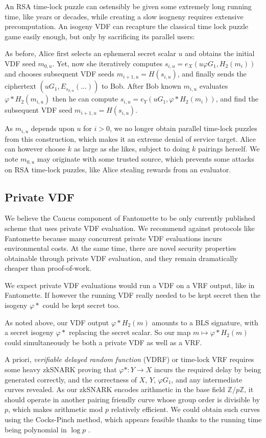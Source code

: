\documentclass{article}
\newcommand{\Z}{\mathbb{Z}}
\begin{document}
An RSA time-lock puzzle can ostensibly be given some extremely long
running time, like years or decades, while creating a slow isogneny
requires extensive precomputation.  An isogeny VDF can recapture the
classical time lock puzzle game easily enough, but only by sacrificing
its parallel users:

As before, Alice first selects an ephemeral secret scalar $u$ and
obtains the initial VDF seed $m_{0,u}$.  Yet, now she iteratively
computes $s_{i,u} = e_X ( u φ G_1, H_2(m_i) )$ and chooses subsequent
VDF seeds $m_{i+1,u} = H(s_{i,u})$, and finally sends the ciphertext
$(u G_1, E_{s_{k,u}}(\ldots))$ to Bob.
After Bob known $m_{i,u}$ evaluates $φ* H_2(m_{i,u})$ then he can
compute $s_{i,u} = e_Y ( u G_1, φ* H_2(m_i) )$, and find the subsequent
VDF seed $m_{i+1,u} = H(s_{i,u})$.

As $m_{i,u}$ depends upon $u$ for $i>0$, we no longer obtain parallel
time-lock puzzles from this construction, which makes it an extreme
denial of service target.  Alice can however choose $k$ as large as
she likes, subject to doing $k$ pairings herself.
We note $m_{0,u}$ may originate with some trusted source, which
prevents some attacks on RSA time-lock puzzles, like Alice stealing
rewards from an evaluator.

\subsection{Private VDF}

We believe the Caucus component of Fantomette \cite[\S5]{Fantomette}
to be only currently published scheme that uses private VDF evaluation.
We recommend against protocols like Fantomette because many concurrent
private VDF evaluations incurs environmental costs.  At the same time,
there are novel security properties obtainable through private VDF
evaluation, and they remain dramatically cheaper than proof-of-work.

We expect private VDF evaluations would run a VDF on a VRF output,
like in Fantomette.  If however the running VDF really needed to
be kept secret then the isogeny $φ*$ could be kept secret too.

As noted above, our VDF output $φ* H_2(m)$ amounts to a BLS signature,
with a secret isogeny $φ*$ replacing the secret scalar.  So our map
$m \mapsto φ* H_2(m)$ could simultaneously be both a private VDF as
well as a VRF.  

A priori, {\em verifiable delayed random function} (VDRF) or time-lock
VRF requires some heavy zkSNARK proving that $φ* : Y \to X$ incurs the
required delay by being generated correctly, and the correctness of
$X$, $Y$, $φ G_1$, and any intermediate curves revealed.  
As our zkSNARK encodes arithmetic in the base field $\Z/p\Z$,
it should operate in another pairing friendly curve whose group order
is divisible by $p$, which makes arithmetic mod $p$ relatively efficient.
We could obtain such curves using the Cocks-Pinch method, which appears
feasible thanks to the running time being polynomial in $\log p$ \cite{ordinary_cocks_pinch}.
\end{document}
